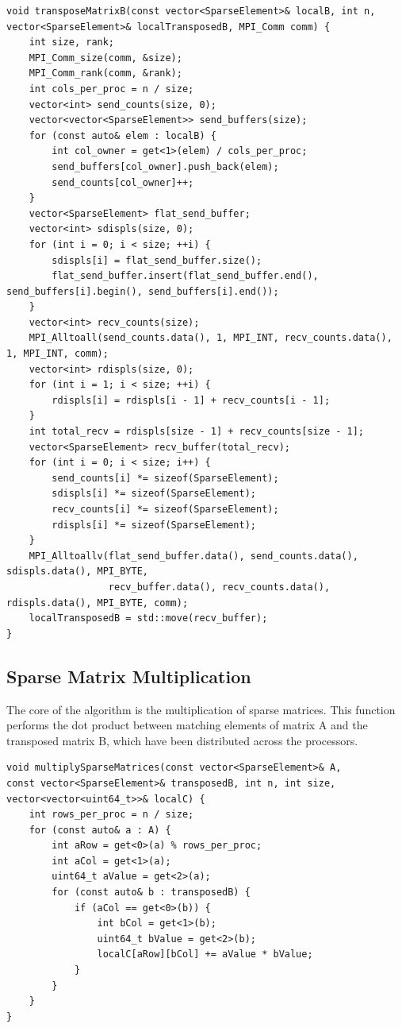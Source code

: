 \documentclass{article}
\begin{document}
\begin{verbatim}
void transposeMatrixB(const vector<SparseElement>& localB, int n,
vector<SparseElement>& localTransposedB, MPI_Comm comm) {
    int size, rank;
    MPI_Comm_size(comm, &size);
    MPI_Comm_rank(comm, &rank);
    int cols_per_proc = n / size;
    vector<int> send_counts(size, 0);
    vector<vector<SparseElement>> send_buffers(size);
    for (const auto& elem : localB) {
        int col_owner = get<1>(elem) / cols_per_proc;
        send_buffers[col_owner].push_back(elem);
        send_counts[col_owner]++;
    }
    vector<SparseElement> flat_send_buffer;
    vector<int> sdispls(size, 0);
    for (int i = 0; i < size; ++i) {
        sdispls[i] = flat_send_buffer.size();
        flat_send_buffer.insert(flat_send_buffer.end(), send_buffers[i].begin(), send_buffers[i].end());
    }
    vector<int> recv_counts(size);
    MPI_Alltoall(send_counts.data(), 1, MPI_INT, recv_counts.data(), 1, MPI_INT, comm);
    vector<int> rdispls(size, 0);
    for (int i = 1; i < size; ++i) {
        rdispls[i] = rdispls[i - 1] + recv_counts[i - 1];
    }
    int total_recv = rdispls[size - 1] + recv_counts[size - 1];
    vector<SparseElement> recv_buffer(total_recv);
    for (int i = 0; i < size; i++) {
        send_counts[i] *= sizeof(SparseElement);
        sdispls[i] *= sizeof(SparseElement);
        recv_counts[i] *= sizeof(SparseElement);
        rdispls[i] *= sizeof(SparseElement);
    }
    MPI_Alltoallv(flat_send_buffer.data(), send_counts.data(), sdispls.data(), MPI_BYTE,
                  recv_buffer.data(), recv_counts.data(), rdispls.data(), MPI_BYTE, comm);
    localTransposedB = std::move(recv_buffer);
}
\end{verbatim}

\subsection{Sparse Matrix Multiplication}
The core of the algorithm is the multiplication of sparse matrices. This function performs the dot product between matching elements of matrix A and the transposed matrix B, which have been distributed across the processors.

\begin{verbatim}
void multiplySparseMatrices(const vector<SparseElement>& A,
const vector<SparseElement>& transposedB, int n, int size, vector<vector<uint64_t>>& localC) {
    int rows_per_proc = n / size;
    for (const auto& a : A) {
        int aRow = get<0>(a) % rows_per_proc;
        int aCol = get<1>(a);
        uint64_t aValue = get<2>(a);
        for (const auto& b : transposedB) {
            if (aCol == get<0>(b)) {
                int bCol = get<1>(b);
                uint64_t bValue = get<2>(b);
                localC[aRow][bCol] += aValue * bValue;
            }
        }
    }
}
\end{verbatim}
\end{document}
